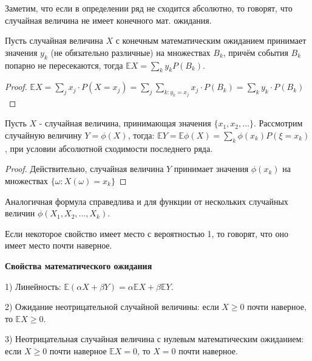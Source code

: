 \documentclass[a4paper]{article}
\begin{document}
\begin{colloq}
   	Заметим, что если в определении ряд не сходится абсолютно, то говорят, что случайная величина не имеет конечного мат. ожидания.
   	
   	\begin{lemma*}
   		Пусть случайная величина $X$ с конечным математическим ожиданием принимает значения $y_k$ (не обязательно различные) на множествах $B_k$, причём события $B_k$ попарно не пересекаются, тогда $\mathbb{E}X= \sum_{k} y_k P(B_k)$.
   	\end{lemma*}
   
   	\begin{proof}
   		$\mathbb{E}X = \sum_{j} x_j \cdot P(X = x_j) = \sum_{j} \sum_{k: y_k = x_j} x_j \cdot P(B_k) = \sum_{k} y_k \cdot P(B_k)$
   	\end{proof}
   	
   	\begin{theorem*}
   		Пусть $X$ - случайная величина, принимающая значения $\{ x_1, x_2, \dots \}$. Рассмотрим случайную величину $Y = \phi(X)$, тогда: $\mathbb{E} Y= \mathbb{E} \phi(X) = \sum_{k} \phi(x_k) P(\xi = x_k)$,
   		при условии абсолютной сходимости последнего ряда.
   	\end{theorem*}
   	
   	\begin{proof}
   		Действительно, случайная величина $Y$ принимает значения $\phi(x_k)$ на множествах $\{ \omega: X(\omega)=x_k \}$	
   	\end{proof}

   	Аналогичная формула справедлива и для функции от нескольких случайных величин $\phi(X_1, X_2, \dots, X_k)$.
   	
   	\begin{definition*}
   		Если некоторое свойство имеет место с вероятностью 1, то говорят, что оно имеет место почти наверное.
   	\end{definition*}
   	
   	\textbf{Свойства математического ожидания}
   	
   	1) Линейность: $\mathbb{E}(\alpha X + \beta Y) = \alpha \mathbb{E}X + \beta \mathbb{E}Y$.
   		
	2) Ожидание неотрицательной случайной величины: если $X \geqslant 0$ почти наверное, то $\mathbb{E}X \geqslant 0$.
   			
	3) Неотрицательная случайная величина с нулевым математическим ожиданием: если $X \geqslant 0$ почти наверное $\mathbb{E}X = 0$, то $X = 0$ почти наверное.


\end{colloq}
\end{document}
